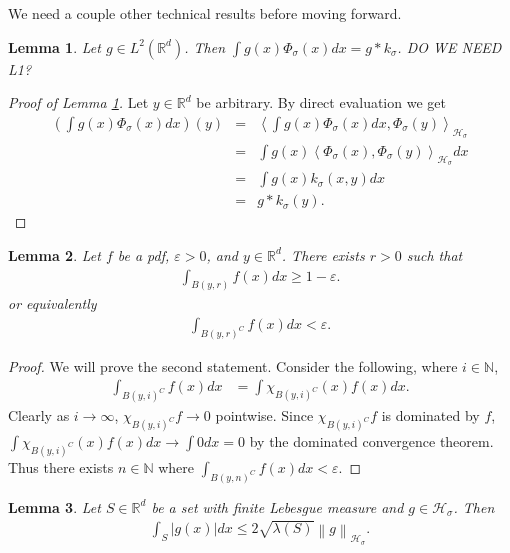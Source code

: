 \documentclass{article} %
\def\hsig{{\mathcal{H}_\sigma}}
\def\ksig{{k_\sigma}}
\def\fm{{\Phi_\sigma}} %
\def\rn{\mathbb{R}}
\def\l{\left}
\def\r{\right}
\newtheorem{lem}{Lemma}
\theoremstyle{definition}
\begin{document}
We need a couple other technical results before moving forward.
\begin{lem}\label{lem:fmconv}
	Let $g \in L^2\left( \rn^d \right)$. Then $\int g(x) \fm(x) dx = g\ast \ksig$. DO WE NEED L1?
\end{lem}
\begin{proof}[Proof of Lemma \ref{lem:fmconv}]
	Let $y \in \rn^d$ be arbitrary. By direct evaluation we get
	\begin{eqnarray*}
		\l(\int g(x) \fm(x) dx\r)(y)
		&=&\l<\int g(x) \fm(x) dx, \fm\left( y \right)\r>_\hsig\\
		&=&\int g(x)\l< \fm(x) , \fm\left( y \right)\r>_\hsig dx\\
		&=&\int g(x) \ksig\left( x,y \right)dx\\
		&=& g\ast\ksig\left( y \right).
	\end{eqnarray*}
\end{proof}
\begin{lem}
	\label{silly}
	Let $f$ be a pdf, $\varepsilon>0$, and $y \in \rn^d$. There exists $r>0$ such that
	\begin{eqnarray*}
		\int_{B\l(y,r\r)} f(x) dx \ge 1-\varepsilon.
	\end{eqnarray*}
	or equivalently
	\begin{eqnarray*}
		\int_{B\l(y,r\r)^C} f(x) dx < \varepsilon.
	\end{eqnarray*}
\end{lem}
\begin{proof}
	We will prove the second statement. Consider the following, where $i\in \mathbb{N}$,
	\begin{eqnarray*}
		\int_{B\l(y,i\r)^C}f\l(x\r) dx
		&= \int \chi_{B\l(y,i\r)^C}\l(x\r) f\l(x\r) dx.
	\end{eqnarray*}
	Clearly as $i \to \infty$, $\chi_{B\l(y,i\r)^C}f \to 0$ pointwise. Since $\chi_{B\l(y,i\r)^C}f$ is dominated by $f$, $\int \chi_{B\l(y,i\r)^C}\l(x\r) f\l(x\r) dx \to \int 0 dx=0$ by the dominated convergence theorem. Thus there exists $n\in\mathbb{N}$ where $\int_{B\l(y,n\r)^C}f\l(x\r) dx <\varepsilon$.
\end{proof}
\begin{lem}\label{hsl1}
	Let $S \in \rn^d$ be a set with finite Lebesgue measure and $g \in \hsig$. Then
	\begin{eqnarray*}
		\int_S \l|g(x)\r| dx \le 2\sqrt{\lambda(S)} \l\|g\r\|_\hsig.
	\end{eqnarray*}
\end{lem}
\end{document}
